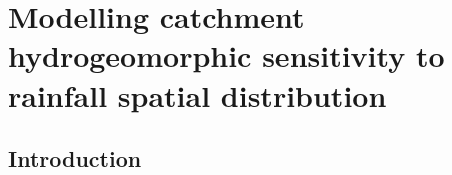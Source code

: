 \chapter{Modelling catchment hydrogeomorphic sensitivity to rainfall spatial distribution}

%
%
\section{Introduction}


